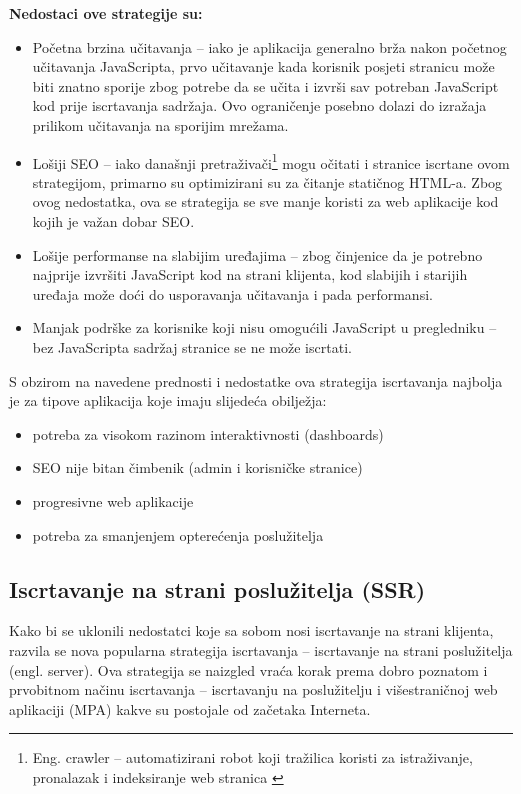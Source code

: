 \bigskip

\textbf{Nedostaci ove strategije su:}

\begin{itemize}
    \item Početna brzina učitavanja – iako je aplikacija generalno brža nakon početnog učitavanja JavaScripta, prvo učitavanje kada korisnik posjeti stranicu može biti znatno sporije zbog potrebe da se učita i izvrši sav potreban JavaScript kod prije iscrtavanja sadržaja. Ovo ograničenje posebno dolazi do izražaja prilikom učitavanja na sporijim mrežama.
    \item Lošiji SEO – iako današnji pretraživači\footnote{Eng. crawler – automatizirani robot koji tražilica koristi za istraživanje, pronalazak i indeksiranje web stranica \cite{googlesearch}} mogu očitati i stranice iscrtane ovom strategijom, primarno su optimizirani su za čitanje statičnog HTML-a. Zbog ovog nedostatka, ova se strategija se sve manje koristi za web aplikacije kod kojih je važan dobar SEO.
    \item Lošije performanse na slabijim uređajima – zbog činjenice da je potrebno najprije izvršiti JavaScript kod na strani klijenta, kod slabijih i starijih uređaja može doći do usporavanja učitavanja i pada performansi.
    \item Manjak podrške za korisnike koji nisu omogućili JavaScript u pregledniku – bez JavaScripta sadržaj stranice se ne može iscrtati.
\end{itemize}

S obzirom na navedene prednosti i nedostatke ova strategija iscrtavanja najbolja je za tipove aplikacija koje imaju slijedeća obilježja:
\begin{itemize}
    \item potreba za visokom razinom interaktivnosti (dashboards)
    \item SEO nije bitan čimbenik (admin i korisničke stranice)
    \item progresivne web aplikacije
    \item potreba za smanjenjem opterećenja poslužitelja
\end{itemize}
\vfill

\subsection{Iscrtavanje na strani poslužitelja (SSR)}

Kako bi se uklonili nedostatci koje sa sobom nosi iscrtavanje na strani klijenta, razvila se nova popularna strategija iscrtavanja – iscrtavanje na strani poslužitelja (engl. server). Ova strategija se naizgled vraća korak prema dobro poznatom i prvobitnom načinu iscrtavanja – iscrtavanju na poslužitelju i višestraničnoj web aplikaciji (MPA) kakve su postojale od začetaka Interneta.

